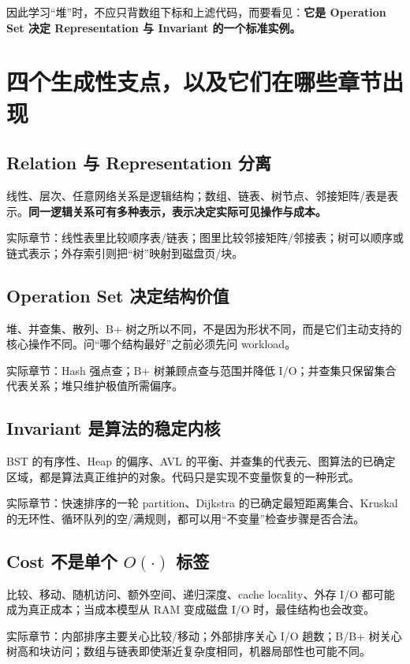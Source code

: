 \documentclass[11pt,a4paper,openany]{ctexbook}
\newcommand{\key}[1]{\textbf{\color{deep}#1}}
\begin{document}
因此学习“堆”时，不应只背数组下标和上滤代码，而要看见：\key{它是 Operation Set 决定 Representation 与 Invariant 的一个标准实例。}

\section{四个生成性支点，以及它们在哪些章节出现}
\subsection{Relation 与 Representation 分离}
线性、层次、任意网络关系是逻辑结构；数组、链表、树节点、邻接矩阵/表是表示。\key{同一逻辑关系可有多种表示，表示决定实际可见操作与成本。}

实际章节：线性表里比较顺序表/链表；图里比较邻接矩阵/邻接表；树可以顺序或链式表示；外存索引则把“树”映射到磁盘页/块。

\subsection{Operation Set 决定结构价值}
堆、并查集、散列、B+ 树之所以不同，不是因为形状不同，而是它们主动支持的核心操作不同。问“哪个结构最好”之前必须先问 workload。

实际章节：Hash 强点查；B+ 树兼顾点查与范围并降低 I/O；并查集只保留集合代表关系；堆只维护极值所需偏序。

\subsection{Invariant 是算法的稳定内核}
BST 的有序性、Heap 的偏序、AVL 的平衡、并查集的代表元、图算法的已确定区域，都是算法真正维护的对象。代码只是实现不变量恢复的一种形式。

实际章节：快速排序的一轮 partition、Dijkstra 的已确定最短距离集合、Kruskal 的无环性、循环队列的空/满规则，都可以用“不变量”检查步骤是否合法。

\subsection{Cost 不是单个 $O(\cdot)$ 标签}
比较、移动、随机访问、额外空间、递归深度、cache locality、外存 I/O 都可能成为真正成本；当成本模型从 RAM 变成磁盘 I/O 时，最佳结构也会改变。

实际章节：内部排序主要关心比较/移动；外部排序关心 I/O 趟数；B/B+ 树关心树高和块访问；数组与链表即使渐近复杂度相同，机器局部性也可能不同。
\end{document}
